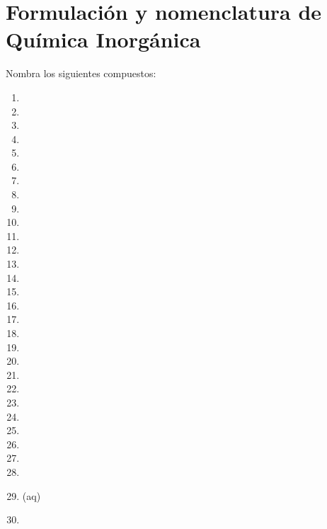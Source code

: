 \section{Formulación y nomenclatura de Química Inorgánica}

\begin{prob}
Nombra los siguientes compuestos:
\begin{multicols}{3}
\begin{enumerate}
	\item {}
	\item {}
	\item {}
	\item {}
	\item {}
	\item {}
	\item {}
	\item {}
	\item {}
	\item {}
	\item {}
	\item {}
	\item {}
	\item {}
	\item {}
	\item {}
	\item {}
	\item {}
	\item {}
	\item {}
	\item {}
	\item {}
	\item {}
	\item {}
	\item {}
	\item {}
	\item {}
	\item {}
	\item {} (aq)
	\item {}
\end{enumerate}
\end{multicols}
\end{prob}

